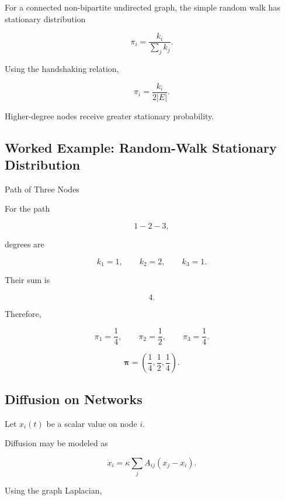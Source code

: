 For a connected non-bipartite undirected graph, the simple random walk has
stationary distribution

\[
\boxed{
\pi_i
=
\frac{k_i}
{\sum_jk_j}.
}
\]

Using the handshaking relation,

\[
\boxed{
\pi_i
=
\frac{k_i}
{2|E|}.
}
\]

Higher-degree nodes receive greater stationary probability.

\subsection{Worked Example: Random-Walk Stationary Distribution}
\label{subsec:worked-random-walk-stationary}

\begin{workedexamplebox}{Path of Three Nodes}

For the path

\[
1-2-3,
\]

degrees are

\[
k_1=1,
\qquad
k_2=2,
\qquad
k_3=1.
\]

Their sum is

\[
4.
\]

Therefore,

\[
\pi_1=\frac14,
\qquad
\pi_2=\frac12,
\qquad
\pi_3=\frac14.
\]

\begin{answerbox}
\[
\boxed{
\boldsymbol{\pi}
=
\left(
\frac14,
\frac12,
\frac14
\right).
}
\]
\end{answerbox}

\end{workedexamplebox}

\subsection{Diffusion on Networks}
\label{subsec:diffusion-on-networks}

Let \(x_i(t)\) be a scalar value on node \(i\).

Diffusion may be modeled as

\[
\boxed{
\dot{x}_i
=
\kappa
\sum_j
A_{ij}
(x_j-x_i).
}
\]

Using the graph Laplacian,

